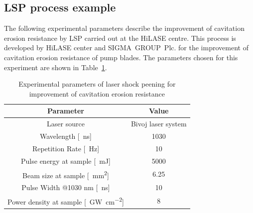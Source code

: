 \subsection{LSP process example}

The following experimental parameters describe the improvement of cavitation erosion resistance by LSP carried out at the HiLASE centre. This process is developed by HiLASE center and SIGMA~GROUP~Plc. for the improvement of cavitation erosion resistance of pump blades. The parameters chosen for this experiment are shown in Table~\ref{experimentalparameters}. 

\begin{table}[H]
\centering
    
    \begin{threeparttable}
            \caption[Experimental parameters of laser shock peening]{Experimental parameters of laser shock peening for improvement of cavitation erosion resistance}
        \begin{tabular}{|c | c|} 
        \hline
            \textbf{Parameter} & \textbf{Value} \\ [0.5ex] 
        \hline
        Laser source & Bivoj laser system  \\
        \hline
        Wavelength [\SI{}{\nano\second}] & 1030 \\
        \hline
        Repetition Rate [\SI{}{\hertz}] & 10  \\ 
        \hline
            Pulse energy at sample [\SI{}{\milli\joule}] & 5000 \\
        \hline
            Beam size at sample [\SI{}{\mm\squared}] & 6.25 \\
        \hline
            Pulse Width @1030 nm [\SI{}{\nano\second}] & 10 \\
        \hline
            Power density at sample [\SI{}{\giga\watt\per\cm\squared}] & 8 \\

        \hline
        \end{tabular}


        \label{experimentalparameters}
    \end{threeparttable}
\end{table}

